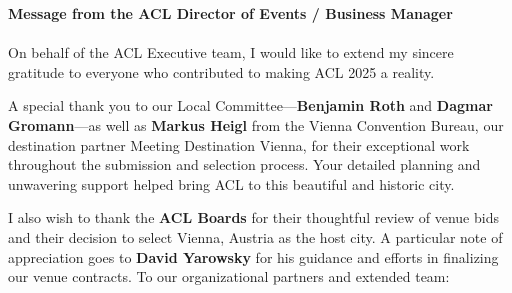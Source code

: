 \textbf{Message from the ACL Director of Events / Business Manager}\\
\\

On behalf of the ACL Executive team, I would like to extend my sincere gratitude to everyone who contributed to making ACL 2025 a reality.

A special thank you to our Local Committee—\textbf{Benjamin Roth} and \textbf{Dagmar Gromann}—as well as \textbf{Markus Heigl} from the Vienna Convention Bureau, our destination partner Meeting Destination Vienna, for their exceptional work throughout the submission and selection process. Your detailed planning and unwavering support helped bring ACL to this beautiful and historic city.

I also wish to thank the \textbf{ACL Boards} for their thoughtful review of venue bids and their decision to select Vienna, Austria as the host city. A particular note of appreciation goes to \textbf{David Yarowsky} for his guidance and efforts in finalizing our venue contracts.
To our organizational partners and extended team:

